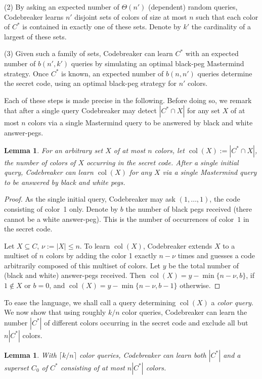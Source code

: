 \documentclass[english,a4paper,11pt]{article}
\DeclareMathOperator{\col}{col}
\newtheorem{lemma}[theorem]{Lemma}
\begin{document}
{(2)
By asking an expected number of $\Theta(n')$ (dependent) random queries, Codebreaker learns $n'$ disjoint sets of colors of size at most $n$ such that each color of $C^*$ is contained in exactly one of these sets. Denote by $k'$ the cardinality of a largest of these sets. 

(3) Given such a family of sets, Codebreaker can learn $C^*$ with an expected number of $b(n', k')$ queries by simulating an optimal black-peg Mastermind strategy. Once $C^*$ is known, an expected number of $b(n,n')$ queries determine the secret code, using an optimal black-peg strategy for $n'$ colors.

Each of these steps is made precise in the following. Before doing so, we remark that after a single query Codebreaker may detect $|C^* \cap X|$ for any set $X$ of at most $n$ colors via a single Mastermind query to be answered by black and white answer-pegs.

\begin{lemma}\label{lemfirst}
  For an arbitrary set $X$ of at most $n$ colors, let $\col(X) := |C^* \cap X|$, the number of colors of $X$ occurring in the secret code. After a single initial query, Codebreaker can learn $\col(X)$ for any $X$ via a single Mastermind query to be answered by black and white pegs.
\end{lemma}

\begin{proof}
  As the single initial query, Codebreaker may ask $(1,\ldots,1)$, the code consisting of color~1 only. Denote by $b$ the number of black pegs received (there cannot be a white answer-peg). This is the number of occurrences of color~$1$ in the secret code. 
  
  Let $X \subseteq C$, $\nu := |X| \le n$. To learn $\col(X)$, Codebreaker extends $X$ to a multiset of $n$ colors by adding the color 1 exactly $n-\nu$ times and guesses a code arbitrarily composed of this multiset of colors. Let $y$ be the total number of (black and white) answer-pegs received. Then $\col(X) = y - \min\{n-\nu,b\}$, if $1 \notin X$ or $b = 0$, and $\col(X) = y - \min\{n-\nu,b-1\}$ otherwise. 
\end{proof}

To ease the language, we shall call a query determining $\col(X)$ a \emph{color query}. We now show that using roughly $k/n$ color queries, Codebreaker can learn the number $|C^*|$ of different colors occurring in the secret code and exclude all but $n |C^*|$ colors.
 
\begin{lemma}\label{lemreduce}
  With  $\lceil k/n \rceil$ color queries, Codebreaker can learn both $|C^*|$ and a superset $C_0$ of $C^*$ consisting of at most $n |C^*|$ colors.
\end{lemma}

}
\end{document}
